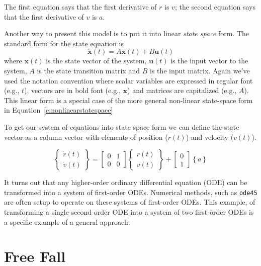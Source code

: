 The first equation says that the first derivative of $r$ is $v$;
the second equation says that the first derivative of $v$ is $a$.

Another way to present this model is to put it into linear \emph{state space} form.  The standard form for the state equation is
\begin{equation} \label{e:statespace}
    \dot{\mathbf{x}}(t) = A \mathbf{x}(t) + B \mathbf{u}(t) 
\end{equation}
where $\mathbf{x}(t)$ is the state vector of the system, $\mathbf{u}(t)$ is the input vector to the system, $A$ is the state transition matrix and $B$ is the input matrix.  Again we've used the notation convention where scalar variables are expressed in regular font (e.g., $t$), vectors are in bold font (e.g., $\mathbf{x}$) and matrices are capitalized (e.g., $A$).  This linear form is a special case of the more general non-linear state-space form in Equation~\ref{e:nonlinearstatespace}

To get our system of equations into state space form we can define the state vector as a column vector with elements of position ($r(t)$) and velocity ($v(t)$).

\begin{equation}
\left\lbrace
\begin{array}{c}
    \dot{r}(t) \\
    \dot{v}(t)
\end{array}
\right\rbrace
=
\left[ \begin{array}{cc}
0 & 1 \\
0 & 0 
\end{array} \right]
\left\{ \begin{array}{c}
    r(t) \\ v(t)
\end{array} \right\}
+ 
\left[ \begin{array}{c}
    0 \\ 1
\end{array} \right]
\left\{ a \right\}
\end{equation}

It turns out that any higher-order ordinary differential equation (ODE) can be transformed into a system of first-order ODEs. Numerical methods, such as \lstinline{ode45} are often setup to operate on these systems of first-order ODEs.  This example, of transforming a single second-order ODE into a system of two first-order ODEs is a specific example of a general approach.

\section{Free Fall}
\label{freefall}

